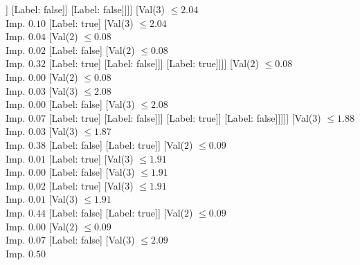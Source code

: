 \documentclass[margin=10pt]{standalone}
\begin{document}
\begin{forest}
															[Label: true]
															[Val($3$) $ \leq 2.03$ \\ Imp. $0.00$
																[Val($3$) $ \leq 2.02$ \\ Imp. $0.00$
																	[Val($3$) $ \leq 2.02$ \\ Imp. $0.13$
																		[Label: false]
																		[Label: true]]
																	[Label: false]]
																[Label: false]]]]
													[Val($3$) $ \leq 2.04$ \\ Imp. $0.10$
														[Label: true]
														[Val($3$) $ \leq 2.04$ \\ Imp. $0.04$
															[Val($2$) $ \leq 0.08$ \\ Imp. $0.02$
																[Label: false]
																[Val($2$) $ \leq 0.08$ \\ Imp. $0.32$
																	[Label: true]
																	[Label: false]]]
															[Label: true]]]]
												[Val($2$) $ \leq 0.08$ \\ Imp. $0.00$
													[Val($2$) $ \leq 0.08$ \\ Imp. $0.03$
														[Val($3$) $ \leq 2.08$ \\ Imp. $0.00$
															[Label: false]
															[Val($3$) $ \leq 2.08$ \\ Imp. $0.07$
																[Label: true]
																[Label: false]]]
														[Label: true]]
													[Label: false]]]]]
									[Val($3$) $ \leq 1.88$ \\ Imp. $0.03$
										[Val($3$) $ \leq 1.87$ \\ Imp. $0.38$
											[Label: false]
											[Label: true]]
										[Val($2$) $ \leq 0.09$ \\ Imp. $0.01$
											[Label: true]
											[Val($3$) $ \leq 1.91$ \\ Imp. $0.00$
												[Label: false]
												[Val($3$) $ \leq 1.91$ \\ Imp. $0.02$
													[Label: true]
													[Val($3$) $ \leq 1.91$ \\ Imp. $0.01$
														[Val($3$) $ \leq 1.91$ \\ Imp. $0.44$
															[Label: false]
															[Label: true]]
														[Val($2$) $ \leq 0.09$ \\ Imp. $0.00$
															[Val($2$) $ \leq 0.09$ \\ Imp. $0.07$
																[Label: false]
																[Val($3$) $ \leq 2.09$ \\ Imp. $0.50$

\end{forest}
\end{document}
